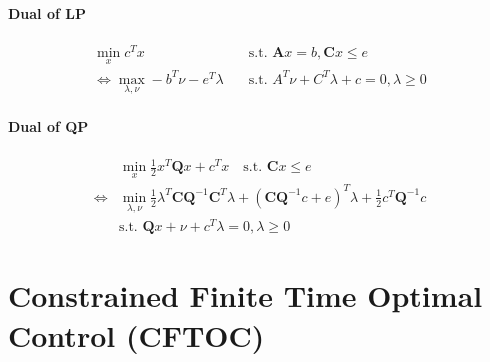 \documentclass[landscape,a4paper,8pt]{scrartcl}
\newcommand\vA{\bm{A}}
\newcommand\vC{\bm{C}}
\newcommand\vQ{\bm{Q}}
\begin{document}
\begin{multicols*}{3}
\paragraph{Dual of LP}
\begin{align*}
     \min_x c^T x & \quad \text{s.t.\ } \vA x = b, \vC x \leq e \\
\iff \max_{\lambda,\nu} -b^T\nu - e^T\lambda & \quad \text{s.t.\ } A^T\nu + C^T\lambda + c = 0, \lambda \geq 0
\end{align*}

\paragraph{Dual of QP}
\begin{align*}
     & \min_x \frac{1}{2}x^T\vQ x + c^T x \quad \text{s.t.\ } \vC x \leq e \\
\iff & \min_{\lambda,\nu} \frac{1}{2}\lambda^T\vC\vQ^{-1}\vC^T\lambda + (\vC\vQ^{-1}c + e)^T\lambda + \frac{1}{2} c^T \vQ^{-1}c \\
     & \text{s.t.\ } \vQ x + \nu + c^T \lambda = 0, \lambda \geq 0
\end{align*}

\section{Constrained Finite Time Optimal Control (CFTOC)}

\end{multicols*}
\end{document}
